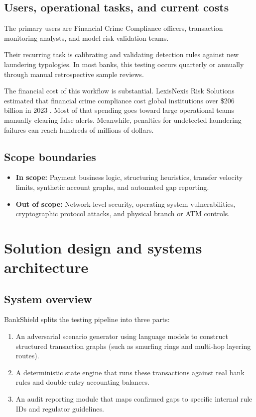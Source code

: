 \documentclass[10pt,twocolumn,a4paper]{article}
\begin{document}
\subsection{Users, operational tasks, and current costs}
The primary users are Financial Crime Compliance officers, transaction monitoring analysts, and model risk validation teams. 

Their recurring task is calibrating and validating detection rules against new laundering typologies. In most banks, this testing occurs quarterly or annually through manual retrospective sample reviews.

The financial cost of this workflow is substantial. LexisNexis Risk Solutions estimated that financial crime compliance cost global institutions over \$206 billion in 2023 \cite{lexisnexis2023}. Most of that spending goes toward large operational teams manually clearing false alerts. Meanwhile, penalties for undetected laundering failures can reach hundreds of millions of dollars.

\subsection{Scope boundaries}
\begin{itemize}
    \item \textbf{In scope:} Payment business logic, structuring heuristics, transfer velocity limits, synthetic account graphs, and automated gap reporting.
    \item \textbf{Out of scope:} Network-level security, operating system vulnerabilities, cryptographic protocol attacks, and physical branch or ATM controls.
\end{itemize}

\section{Solution design and systems architecture}

\subsection{System overview}
BankShield splits the testing pipeline into three parts:
\begin{enumerate}
    \item An adversarial scenario generator using language models to construct structured transaction graphs (such as smurfing rings and multi-hop layering routes).
    \item A deterministic state engine that runs these transactions against real bank rules and double-entry accounting balances.
    \item An audit reporting module that maps confirmed gaps to specific internal rule IDs and regulator guidelines.
\end{enumerate}
\end{document}
